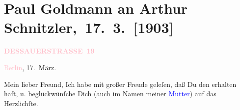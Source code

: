 

\renewcommand{\erwaehntePersonen}{Personen: Clementine Goldmann, Theodore Rottenberg, Paul Schlenther, Olga Schnitzler, Ida d’Albert}
\renewcommand{\erwaehnteInstitutionen}{Institutionen: Bauernfeld-Preis, Burgtheater, Deutsches Theater Berlin, Neue Freie Presse}
\renewcommand{\erwaehnteOrte}{Orte: Berlin, Dessauer Straße, Deutsches Theater Berlin, Volkstheater, Wien}
\renewcommand{\erwaehnteWerke}{Werke: Berliner Theater. (»Der Schleier der Beatrice« von Arthur Schnitzler.), Berliner Theater. (»Lebendige Stunden« von Arthur Schnitzler.), Der Schleier der Beatrice. Schauspiel in fünf Akten, Lebendige Stunden. Vier Einakter, Neue Freie Presse, Tagebuch}
\section[ Paul Goldmann an Arthur Schnitzler, 17. 3. {[}1903{]}]{Paul Goldmann an Arthur Schnitzler, 17. 3. {[}1903{]}}
\nopagebreak{}
\rehead{ }\normalsize\beginnumbering{}
\toendnotes[C]{\smallbreak\pagebreak[2]}
\toendnotes[C]{\smallbreak}
\pstart
           \noindent{}\raggedleft{}{\pb}\textcolor{gray}{\textbf{\textcolor{pink}{DESSAUERSTRASSE 19}{}\ledrightnote{\textcolor{pink}{Dessauer Straße}}}}\pend
           
\pstart
           \textcolor{pink}{Berlin}{}\ledrightnote{\textcolor{pink}{Berlin}}, 17. März.\pend
           
\pstart\center{}Mein lieber Freund,\pend
\pstart
           Ich habe mit großer Freude \strikeout{\textcolor{gray}{ver}} geleſen, daß Du den \label{K_L03369-1v}\label{K_L03369-1h} erhalten
               haſt, u. beglückwünſche Dich (auch im Namen meiner \textcolor{blue}{Mutter}{}\ledrightnote{{$\rightarrow$}\textcolor{blue}{Clementine Goldmann}}) auf das Herzlichſte.\pend
           
